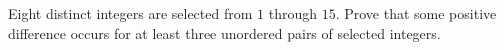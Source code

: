 Eight distinct integers are selected from $1$ through $15$. Prove that some positive difference occurs for at least three unordered pairs of selected integers.
